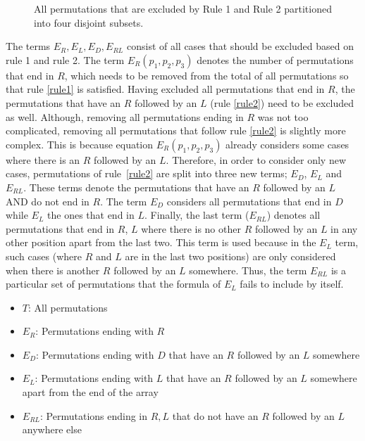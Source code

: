 \begin{figure}[H]
    \centering
    \caption{All permutations that are excluded by Rule 1 and Rule 2
    partitioned into four disjoint subsets.}
    \label{fig:venn_diagram_with_subsets}
\end{figure}

The terms \(E_R, E_L, E_D, E_{RL}\) consist of all cases that should be excluded
based on rule 1 and rule 2.
The term \(E_R(p_1,p_2,p_3)\) denotes the number of permutations that end in
\(R\), which needs to be removed from the total of all permutations so that rule
\ref{rule1} is satisfied.
Having excluded all permutations that end in \(R\), the
permutations that have an \(R\) followed by an \(L\) (rule \ref{rule2}) need to
be excluded as well.
Although, removing all permutations ending in \(R\) was not too complicated,
removing all permutations that follow rule \ref{rule2} is slightly more complex.
This is because equation \(E_R(p_1,p_2,p_3)\) already considers some cases where
there is an \(R\) followed by an \(L\).
Therefore, in order to consider only new cases, permutations of rule~\ref{rule2}
are split into three new terms; \(E_D\), \(E_L\) and \(E_{RL}\).
These terms denote the permutations that have an \(R\) followed by an \(L\) AND
do not end in \(R\).
The term \(E_D\) considers all permutations that end in \(D\) while \(E_L\) the
ones that end in \(L\).
Finally, the last term (\(E_{RL}\)) denotes all permutations that end in \(R\),
\(L\) where there is no other \(R\) followed by an \(L\) in any other position
apart from the last two.
This term is used because in the \(E_L\) term, such cases (where \(R\) and \(L\)
are in the last two positions) are only considered when there is another \(R\)
followed by an \(L\) somewhere.
Thus, the term \(E_{RL}\) is a particular set of permutations that the formula
of \(E_L\) fails to include by itself.

\begin{itemize}
    \item \(T\): All permutations
    \item \(E_R\): Permutations ending with \(R\)
    \item \(E_D\): Permutations ending with \(D\) that have an \(R\) followed by
    an \(L\) somewhere
    \item \(E_L\): Permutations ending with \(L\) that have an \(R\) followed by
    an \(L\) somewhere apart from the end of the array
    \item \(E_{RL}\): Permutations ending in \(R, L\) that do not have an \(R\)
    followed by an \(L\) anywhere else
\end{itemize}


